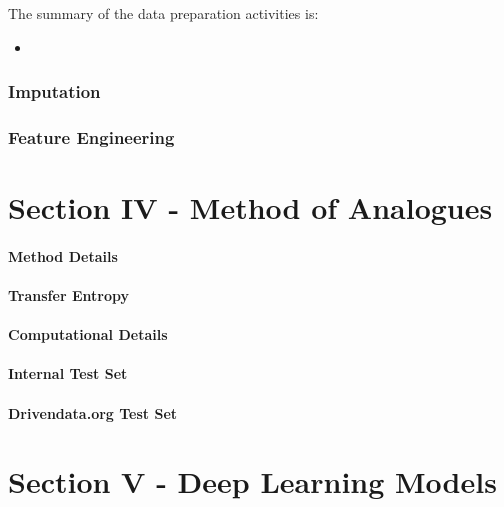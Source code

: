 \documentclass[floatsintext,man]{apa6}
\theoremstyle{definition}
\theoremstyle{definition}
\theoremstyle{definition}
\theoremstyle{remark}
\begin{document}
The summary of the data preparation activities is:

\begin{itemize}
\item
\end{itemize}

\subsubsection{Imputation}\label{imputation}

\subsubsection{Feature Engineering}\label{feature-engineering}

\newpage

\section{Section IV - Method of
Analogues}\label{section-iv---method-of-analogues}

\paragraph{Method Details}\label{method-details}

\paragraph{Transfer Entropy}\label{transfer-entropy}

\paragraph{Computational Details}\label{computational-details}

\paragraph{Internal Test Set}\label{internal-test-set}

\paragraph{Drivendata.org Test Set}\label{drivendata.org-test-set}

\newpage

\section{Section V - Deep Learning
Models}\label{section-v---deep-learning-models}
\end{document}
